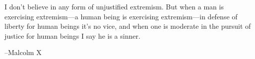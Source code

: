 \documentclass{exam}
\begin{document}

\ifprintanswers
\else

\vspace{14 cm}

I don't believe in any form of unjustified extremism. But when a man is exercising extremism---a human being is
exercising extremism---in defense of liberty for human beings it's no vice, and when one is moderate in the pursuit of
justice for human beings I say he is a sinner.

\hspace{0.5 cm} 
--Malcolm X


\fi
\end{document}
